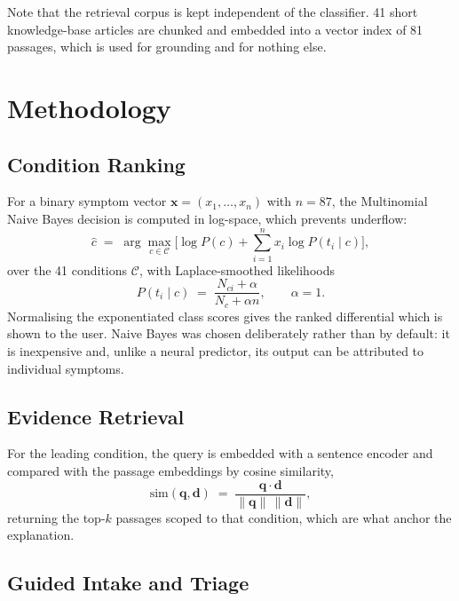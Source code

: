 \documentclass[conference]{IEEEtran}
\begin{document}
Note that the retrieval corpus is kept independent of the classifier. 41
short knowledge-base articles are chunked and embedded into a vector index of
81 passages, which is used for grounding and for nothing else.

\section{Methodology}

\subsection{Condition Ranking}

For a binary symptom vector $\mathbf{x}=(x_1,\dots,x_n)$ with $n=87$, the
Multinomial Naive Bayes decision is computed in log-space, which prevents
underflow:
\begin{equation}
\hat{c} \;=\; \arg\max_{c \in \mathcal{C}}
\Big[\log P(c) + \sum_{i=1}^{n} x_i \log P(t_i \mid c)\Big],
\end{equation}
over the 41 conditions $\mathcal{C}$, with Laplace-smoothed likelihoods
\begin{equation}
P(t_i \mid c) \;=\; \frac{N_{ci}+\alpha}{N_c+\alpha n},
\qquad \alpha = 1 .
\end{equation}
Normalising the exponentiated class scores gives the ranked differential
which is shown to the user. Naive Bayes was chosen deliberately rather than
by default: it is inexpensive and, unlike a neural predictor, its output can
be attributed to individual symptoms.

\subsection{Evidence Retrieval}

For the leading condition, the query is embedded with a sentence encoder
\cite{sbert} and compared with the passage embeddings by cosine similarity,
\begin{equation}
\mathrm{sim}(\mathbf{q},\mathbf{d}) \;=\;
\frac{\mathbf{q}\cdot\mathbf{d}}{\|\mathbf{q}\|\,\|\mathbf{d}\|},
\end{equation}
returning the top-$k$ passages scoped to that condition, which are what
anchor the explanation.

\subsection{Guided Intake and Triage}
\end{document}
